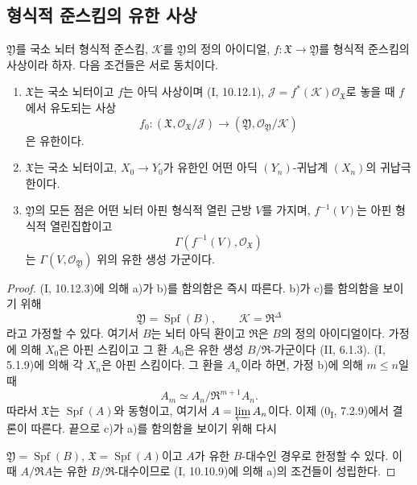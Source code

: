 \subsection{형식적 준스킴의 유한 사상}

\begin{proposition}[4.8.1]
\label{III.4.8.1-fr}
$\mathfrak Y$를 국소 뇌터 형식적 준스킴, $\mathcal K$를
$\mathfrak Y$의 정의 아이디얼, $f:\mathfrak X\to\mathfrak Y$를
형식적 준스킴의 사상이라 하자. 다음 조건들은 서로 동치이다.
\begin{enumerate}
\item[a)]
$\mathfrak X$는 국소 뇌터이고 $f$는 아딕 사상이며 (I, 10.12.1),
$\mathcal J=f^*(\mathcal K)\mathcal O_{\mathfrak X}$로 놓을 때
$f$에서 유도되는 사상
\[
f_0:(\mathfrak X,\mathcal O_{\mathfrak X}/\mathcal J)
\longrightarrow
(\mathfrak Y,\mathcal O_{\mathfrak Y}/\mathcal K)
\]
은 유한이다.
\item[b)]
$\mathfrak X$는 국소 뇌터이고, $X_0\to Y_0$가 유한인 어떤 아딕
$(Y_n)$-귀납계 $(X_n)$의 귀납극한이다.
\item[c)]
$\mathfrak Y$의 모든 점은 어떤 뇌터 아핀 형식적 열린 근방 $V$를
가지며, $f^{-1}(V)$는 아핀 형식적 열린집합이고
\[
\Gamma(f^{-1}(V),\mathcal O_{\mathfrak X})
\]
는 $\Gamma(V,\mathcal O_{\mathfrak Y})$ 위의 유한 생성 가군이다.
\end{enumerate}
\end{proposition}

\begin{proof}
(I, 10.12.3)에 의해 a)가 b)를 함의함은 즉시 따른다. b)가 c)를
함의함을 보이기 위해
\[
\mathfrak Y=\operatorname{Spf}(B),\qquad
\mathcal K=\mathfrak R^\Delta
\]
라고 가정할 수 있다. 여기서 $B$는 뇌터 아딕 환이고
$\mathfrak R$은 $B$의 정의 아이디얼이다. 가정에 의해 $X_0$은
아핀 스킴이고 그 환 $A_0$은 유한 생성
$B/\mathfrak R$-가군이다 (II, 6.1.3). (I, 5.1.9)에 의해 각
$X_n$은 아핀 스킴이다. 그 환을 $A_n$이라 하면, 가정 b)에 의해
$m\leq n$일 때
\[
A_m\simeq A_n/\mathfrak R^{m+1}A_n.
\]
따라서 $\mathfrak X$는 $\operatorname{Spf}(A)$와 동형이고, 여기서
$A=\varprojlim A_n$이다. 이제 (0\textsubscript{I}, 7.2.9)에서
결론이 따른다. 끝으로 c)가 a)를 함의함을 보이기 위해 다시


$\mathfrak Y=\operatorname{Spf}(B)$,
$\mathfrak X=\operatorname{Spf}(A)$이고 $A$가 유한
$B$-대수인 경우로 한정할 수 있다. 이때
$A/\mathfrak RA$는 유한 $B/\mathfrak R$-대수이므로
(I, 10.10.9)에 의해 a)의 조건들이 성립한다.
\end{proof}

